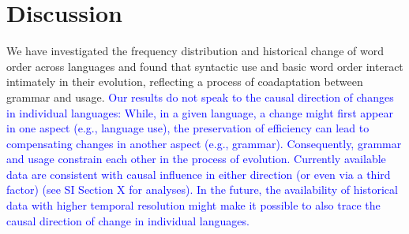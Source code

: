 \documentclass[9pt,twocolumn,twoside,lineno]{pnas-new}
\begin{document}










\section*{Discussion}

We have investigated the frequency distribution and historical change of word order  across languages and found that syntactic use and basic word order interact intimately in their evolution,  reflecting a process of coadaptation  between grammar and usage.
\textcolor{blue}{Our results do not speak to the causal direction of changes in individual languages: 
While, in a given language, a change might first appear in one aspect (e.g., language use), the preservation of efficiency can lead to compensating changes in another aspect (e.g., grammar).
Consequently, grammar and usage constrain each other in the process of evolution.
Currently available data are consistent with causal influence in either direction (or even via a third factor) (see SI Section X for analyses).
In the future, the availability of historical data with higher temporal resolution might make it possible to also trace the causal direction of change in individual languages.}
\end{document}
